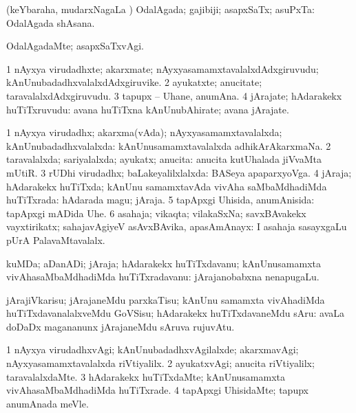 \bentry
{}
\gl{\gu}
\bmng
(keYbaraha, mudarxNagaLa \vi) OdalAgada; gajibiji; asapxSaTx; asuPxTa:  OdalAgada shAsana. 
\emng
\eentry

\bentry
{}
\gl{\kirxvi}
\bmng
OdalAgadaMte; asapxSaTxvAgi. 
\emng
\eentry

\bentry
{}
\gl{\gu}
\bmng
\bnum
\num{1} nAyxya virudadhxte; akarxmate; nAyxyasamamxtavalalxdAdxgiruvudu; kAnUnubadadhxvalalxdAdxgiruvike. 
\num{2} ayukatxte; anucitate; taravalalxdAdxgiruvudu. 
\num{3} tapupx -- Uhane, anumAna. 
\num{4} jArajate; hAdarakekx huTiTxruvudu:  avana huTiTxna kAnUnubAhirate; avana jArajate. 
\enum
\emng
\eentry

\bentry
{}
\gl{\gu}
\bmng
\bnum
\num{1} nAyxya virudadhx; akarxma(vAda); nAyxyasamamxtavalalxda; kAnUnubadadhxvalalxda:  kAnUnusamamxtavalalxda adhikArAkarxmaNa. 
\num{2} taravalalxda; sariyalalxda; ayukatx; anucita:  anucita kutUhalada jiVvaMta mUtiR. 
\num{3} rUDhi virudadhx; baLakeyalilxlalxda:  BASeya apaparxyoVga. 
\num{4} jAraja; hAdarakekx huTiTxda; kAnUnu samamxtavAda vivAha saMbaMdhadiMda huTiTxrada:  hAdarada magu; jAraja. 
\num{5} tapApxgi Uhisida, anumAnisida:  tapApxgi mADida Uhe. 
\num{6} asahaja; vikaqta; vilakaSxNa; savxBAvakekx vayxtirikatx; sahajavAgiyeV asAvxBAvika, apasAmAnayx:  I asahaja sasayxgaLu pUrA PalavaMtavalalx. 
\enum
\emng
\eentry

\bentry
{}
\gl{\nA}
\bmng
kuMDa; aDanADi; jAraja; hAdarakekx huTiTxdavanu; kAnUnusamamxta vivAhasaMbaMdhadiMda huTiTxradavanu:  jArajanobabxna nenapugaLu. 
\emng
\eentry

\bentry
{}
\gl{\sakirx}
\bmng
jArajiVkarisu; jArajaneMdu parxkaTisu; kAnUnu samamxta vivAhadiMda huTiTxdavanalalxveMdu GoVSisu; hAdarakekx huTiTxdavaneMdu sAru:  avaLa doDaDx magananunx jArajaneMdu sAruva rujuvAtu. 
\emng
\eentry

\bentry
{}
\gl{\kirxvi}
\bmng
\bnum
\num{1} nAyxya virudadhxvAgi; kAnUnubadadhxvAgilalxde; akarxmavAgi; nAyxyasamamxtavalalxda riVtiyalilx. 
\num{2} ayukatxvAgi; anucita riVtiyalilx; taravalalxdaMte. 
\num{3} hAdarakekx huTiTxdaMte; kAnUnusamamxta vivAhasaMbaMdhadiMda huTiTxrade. 
\num{4} tapApxgi UhisidaMte; tapupx anumAnada meVle. 
\enum
\emng
\eentry

